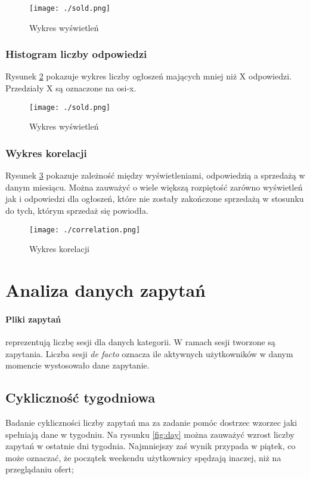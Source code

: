 \documentclass[a4paper,11pt]{article}
\begin{document}
\begin{figure}[H]
	\centering
	\texttt{[image: ./sold.png]}
	\caption{\label{fig:wyswietlenia}Wykres wyświetleń}
\end{figure}

\subsubsection{Histogram liczby odpowiedzi} 
Rysunek \ref{fig:odpowiedzi} pokazuje wykres liczby ogłoszeń mających mniej niż X odpowiedzi. Przedziały X są oznaczone na osi-x.

\begin{figure}[H]
	\centering
	\texttt{[image: ./sold.png]}
	\caption{\label{fig:odpowiedzi}Wykres wyświetleń}
\end{figure}

\subsubsection{Wykres korelacji} 
Rysunek \ref{fig:korelacja} pokazuje zależność między wyświetleniami, odpowiedzią a sprzedażą w danym miesiącu. Można zauważyć o wiele większą rozpiętość zarówno wyświetleń jak i odpowiedzi dla ogłoszeń, które nie zostały zakończone sprzedażą w stosunku do tych, którym sprzedaż się powiodła. 
 
\begin{figure}[H]
	\centering
	\texttt{[image: ./correlation.png]}
	\caption{\label{fig:korelacja}Wykres korelacji}
\end{figure}

\section{Analiza danych zapytań} 
\paragraph{Pliki zapytań} reprezentują liczbę sesji dla danych kategorii. W ramach sesji tworzone są zapytania. Liczba sesji \textit{de facto} oznacza ile aktywnych użytkowników w danym momencie wystosowało dane zapytanie.


\subsection{Cykliczność tygodniowa}
Badanie cykliczności liczby zapytań ma za zadanie pomóc dostrzec wzorzec jaki spełniają dane w tygodniu. Na rysunku \ref{fig:day} można zauważyć wzrost liczby zapytań w ostatnie dni tygodnia. Najmniejszy zaś wynik przypada w piątek, co może oznaczać, że początek weekendu użytkownicy spędzają inaczej, niż na przeglądaniu ofert;
   
\end{document}
